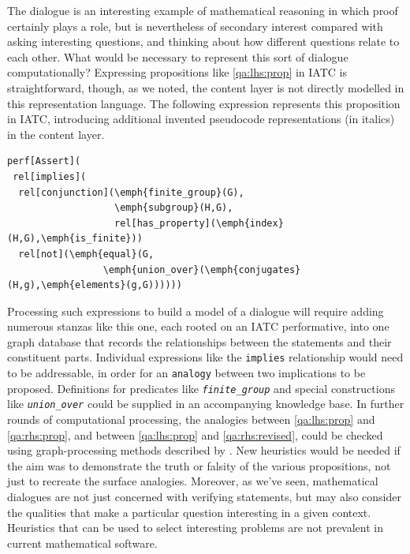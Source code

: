\documentclass[smallextended,oneside]{svjour3}       %
\newcommand\nothing[1]{#1}
\let\paragraph\nothing
\begin{document}
The dialogue is an interesting example of mathematical reasoning in
which proof certainly plays a role, but is nevertheless of secondary
interest compared with asking interesting questions, and thinking
about how different questions relate to each other.
What would be necessary to represent this sort of dialogue computationally?
Expressing propositions like \ref{qa:lhs:prop} in IATC is 
straightforward, though, as we noted, the content layer is not
directly modelled in this representation language.  The
following expression represents this proposition in IATC, introducing
additional invented pseudocode representations (in italics) in the content layer.

\begin{Verbatim}[commandchars=\\\{\}]
perf[Assert](
 rel[implies](
  rel[conjunction](\emph{finite_group}(G),
                   \emph{subgroup}(H,G),
                   rel[has_property](\emph{index}(H,G),\emph{is_finite}))
  rel[not](\emph{equal}(G,
                 \emph{union_over}(\emph{conjugates}(H,g),\emph{elements}(g,G))))))
\end{Verbatim}

Processing such expressions to build a model of a dialogue
will require adding numerous stanzas like this one, each rooted on an IATC
performative, into one graph database that records the relationships
between the statements and their constituent parts.  Individual expressions
like the \texttt{implies} relationship would need to be addressable,
in order for an \texttt{analogy} between two implications to be
proposed.
Definitions for predicates like \texttt{\textit{finite_group}}
and special constructions like \texttt{\textit{union_over}}
could be supplied in an accompanying knowledge base.   In further rounds of
computational processing, the analogies between
\ref{qa:lhs:prop} and \ref{qa:rhs:prop}, and between
\ref{qa:lhs:prop} and \ref{qa:rhs:revised}, could be checked
 using graph-processing methods described
by \citet{sowa2003analogical}.  
New heuristics would be needed
if the aim was to demonstrate the truth or falsity of the various
propositions, not just to recreate the surface analogies.
Moreover, as we've seen, mathematical dialogues are not just concerned
with verifying statements, but may
also consider the qualities that make a particular
question interesting in a given context.   Heuristics that can 
be used to select interesting problems are not prevalent in current 
mathematical software.
\end{document}
